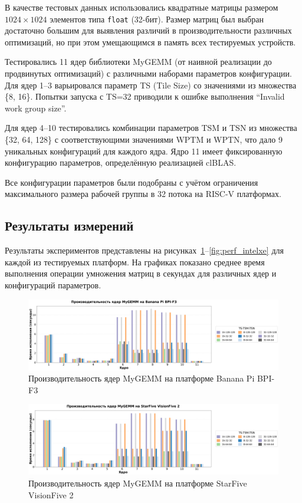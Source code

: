 В качестве тестовых данных использовались квадратные матрицы размером $1024 \times 1024$ элементов типа \texttt{float} (32-бит). Размер матриц был выбран достаточно большим для выявления различий в производительности различных оптимизаций, но при этом умещающимся в память всех тестируемых устройств.

Тестировались 11 ядер библиотеки MyGEMM (от наивной реализации до продвинутых оптимизаций) с различными наборами параметров конфигурации. Для ядер 1--3 варьировался параметр TS (Tile Size) со значениями из множества \{8, 16\}. Попытки запуска с TS=32 приводили к ошибке выполнения ``Invalid work group size''.

Для ядер 4--10 тестировались комбинации параметров TSM и TSN из множества \{32, 64, 128\} с соответствующими значениями WPTM и WPTN, что дало 9 уникальных конфигураций для каждого ядра. Ядро 11 имеет фиксированную конфигурацию параметров, определённую реализацией clBLAS.

Все конфигурации параметров были подобраны с учётом ограничения максимального размера рабочей группы в 32 потока на RISC-V платформах.

\subsection{Результаты измерений}

Результаты экспериментов представлены на рисунках~\ref{fig:perf_bananapi}--\ref{fig:perf_intelxe} для каждой из тестируемых платформ. На графиках показано среднее время выполнения операции умножения матриц в секундах для различных ядер и конфигураций параметров.

\begin{figure}[H]
\centering
\includegraphics[width=1\textwidth]{figures/banana_pi.png}
\caption{Производительность ядер MyGEMM на платформе Banana Pi BPI-F3}
\label{fig:perf_bananapi}
\end{figure}

\begin{figure}[H]
\centering
\includegraphics[width=1\textwidth]{figures/starfive.png}
\caption{Производительность ядер MyGEMM на платформе StarFive VisionFive 2}
\label{fig:perf_starfive}
\end{figure}

